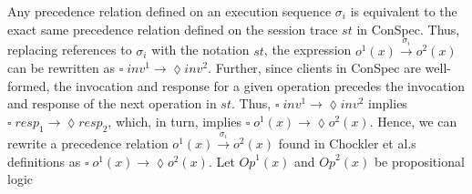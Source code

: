 \documentclass[journal,compsoc]{IEEEtran}
\begin{document}
   Any precedence relation defined on an execution sequence $\sigma_i$  is
   equivalent to the exact same precedence relation defined on the session trace $\mathit{st}$ in ConSpec.
    Thus, replacing references to $\sigma_i$  with the notation  $\mathit{st}$, the expression $ \mathit{o}^1(x) \xrightarrow{\sigma_i} \mathit{o}^2(x) $ can be rewritten as  $ \square\; \mathit{inv}^1 \rightarrow \lozenge \mathit{inv}^2$. %
     Further, since clients in ConSpec are well-formed, the invocation and response for a given operation precedes the invocation and response of the next operation in $\mathit{st}$.  %
  Thus,  $ \square\; \mathit{inv}^1 \rightarrow \lozenge \mathit{inv}^2$ %
   implies $  \square\; \mathit{resp}_1 \rightarrow \lozenge  \mathit{resp}_2 $, %
    which, in turn, implies $ \square\; \mathit{o}^1(x) \rightarrow \lozenge \mathit{o}^2(x)$. %
 Hence, we can rewrite a precedence relation $ \mathit{o}^1(x) \xrightarrow{\sigma_i} \mathit{o}^2(x) $ found in Chockler et al.\textquotesingle s definitions as $ \square\; \mathit{o}^1(x) \rightarrow \lozenge \mathit{o}^2(x)$.  %
 Let $\mathit{Op}^1(x)$ and $\mathit{Op}^2(x)$  be propositional logic
\end{document}
